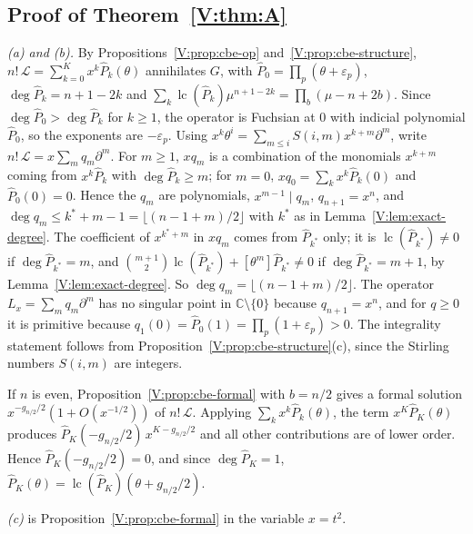 \documentclass[11pt,a4paper]{article}
\theoremstyle{definition}
\theoremstyle{remark}
\newcommand{\C}{\mathbb C}
\newcommand{\fl}[1]{\lfloor #1\rfloor}
\DeclareMathOperator{\lc}{lc}
\numberwithin{equation}{section}
\begin{document}
\subsection{Proof of Theorem~\ref{V:thm:A}}
\emph{(a) and (b).} By Propositions~\ref{V:prop:cbe-op} and~\ref{V:prop:cbe-structure}, $n!\,\mathcal L=\sum_{k=0}^{K}x^k\hat P_k(\theta)$ annihilates $G$, with $\hat P_0=\prod_p(\theta+\varepsilon_p)$, $\deg\hat P_k=n+1-2k$ and $\sum_k\lc(\hat P_k)\mu^{n+1-2k}=\prod_b(\mu-n+2b)$. Since $\deg\hat P_0>\deg\hat P_k$ for $k\ge1$, the operator is Fuchsian at $0$ with indicial polynomial $\hat P_0$, so the exponents are $-\varepsilon_p$. Using $x^k\theta^i=\sum_{m\le i}S(i,m)x^{k+m}\partial^m$, write $n!\,\mathcal L=x\sum_mq_m\partial^m$. For $m\ge1$, $xq_m$ is a combination of the monomials $x^{k+m}$ coming from $x^k\hat P_k$ with $\deg\hat P_k\ge m$; for $m=0$, $xq_0=\sum_kx^k\hat P_k(0)$ and $\hat P_0(0)=0$. Hence the $q_m$ are polynomials, $x^{m-1}\mid q_m$, $q_{n+1}=x^n$, and $\deg q_m\le k^*+m-1=\fl{(n-1+m)/2}$ with $k^*$ as in Lemma~\ref{V:lem:exact-degree}. The coefficient of $x^{k^*+m}$ in $xq_m$ comes from $\hat P_{k^*}$ only; it is $\lc(\hat P_{k^*})\ne0$ if $\deg\hat P_{k^*}=m$, and $\binom{m+1}2\lc(\hat P_{k^*})+[\theta^m]\hat P_{k^*}\ne0$ if $\deg\hat P_{k^*}=m+1$, by Lemma~\ref{V:lem:exact-degree}. So $\deg q_m=\fl{(n-1+m)/2}$. The operator $L_x=\sum_mq_m\partial^m$ has no singular point in $\C\setminus\{0\}$ because $q_{n+1}=x^n$, and for $q\ge0$ it is primitive because $q_1(0)=\hat P_0(1)=\prod_p(1+\varepsilon_p)>0$. The integrality statement follows from Proposition~\ref{V:prop:cbe-structure}(c), since the Stirling numbers $S(i,m)$ are integers.

If $n$ is even, Proposition~\ref{V:prop:cbe-formal} with $b=n/2$ gives a formal solution $x^{-g_{n/2}/2}(1+O(x^{-1/2}))$ of $n!\,\mathcal L$. Applying $\sum_kx^k\hat P_k(\theta)$, the term $x^K\hat P_K(\theta)$ produces $\hat P_K(-g_{n/2}/2)\,x^{K-g_{n/2}/2}$ and all other contributions are of lower order. Hence $\hat P_K(-g_{n/2}/2)=0$, and since $\deg\hat P_K=1$, $\hat P_K(\theta)=\lc(\hat P_K)(\theta+g_{n/2}/2)$.

\emph{(c)} is Proposition~\ref{V:prop:cbe-formal} in the variable $x=t^2$.
\end{document}
